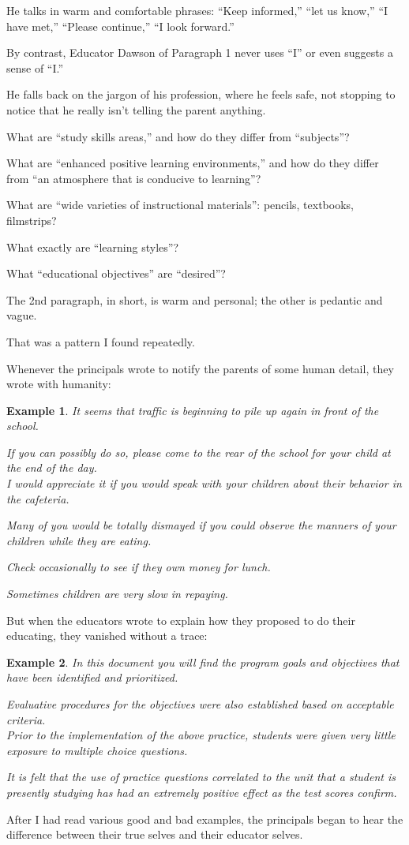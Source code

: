 \documentclass{book}
\numberwithin{equation}{section}
\newtheorem{example}{Example}[chapter]
\begin{document}
He talks in warm and comfortable phrases: ``Keep informed,'' ``let us know,'' ``I have met,'' ``Please continue,'' ``I look forward.''

%
By contrast, Educator Dawson of Paragraph 1 never uses ``I'' or even suggests a sense of ``I.''

He falls back on the jargon of his profession, where he feels safe, not stopping to notice that he really isn't telling the parent anything.

What are ``study skills areas,'' and how do they differ from ``subjects''?

What are ``enhanced positive learning environments,'' and how do they differ from ``an atmosphere that is conducive to learning''?

What are ``wide varieties of instructional materials'': pencils, textbooks, filmstrips?

What exactly are ``learning styles''?

What ``educational objectives'' are ``desired''?

%
The 2nd paragraph, in short, is warm and personal; the other is pedantic and vague.

That was a pattern I found repeatedly.

Whenever the principals wrote to notify the parents of some human detail, they wrote with humanity:
\begin{example}
    It seems that traffic is beginning to pile up again in front of the school.
    
    If you can possibly do so, please come to the rear of the school for your child at the end of the day.
    \\
    
    I would appreciate it if you would speak with your children about their behavior in the cafeteria.
    
    Many of you would be totally dismayed if you could observe the manners of your children while they are eating.
    
    Check occasionally to see if they own money for lunch.
    
    Sometimes children are very slow in repaying.
\end{example}
But when the educators wrote to explain how they proposed to do their educating, they vanished without a trace:
\begin{example}
    In this document you will find the program goals and objectives that have been identified and prioritized.
    
    Evaluative procedures for the objectives were also established based on acceptable criteria.
    \\
    
    Prior to the implementation of the above practice, students were given very little exposure to multiple choice questions.
    
    It is felt that the use of practice questions correlated to the unit that a student is presently studying has had an extremely positive effect as the test scores confirm.
\end{example}
After I had read various good and bad examples, the principals began to hear the difference between their true selves and their educator selves.
\end{document}
